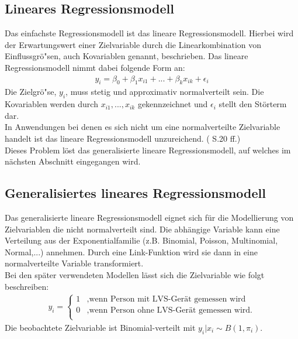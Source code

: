 \documentclass[12pt]{scrreprt}
\begin{document}
\subsection{Lineares Regressionsmodell}
Das einfachste Regressionsmodell ist das lineare Regressionsmodell. Hierbei wird der Erwartungswert einer Zielvariable durch die Linearkombination von Einflussgrö"sen, auch Kovariablen genannt, beschrieben. Das lineare Regressionsmodell nimmt dabei folgende Form an:
\begin{align}
y_{i}= \beta_{0}+\beta_{1}x_{i1}+...+\beta_{k}x_{ik}+\epsilon_{i}
\end{align}
Die Zielgrö"se, $y_{i}$, muss stetig und approximativ normalverteilt sein. Die Kovariablen werden durch $x_{i1},...,x_{ik}$ gekennzeichnet und $\epsilon_{i}$ stellt den Störterm dar. \\
In Anwendungen bei denen es sich nicht um eine normalverteilte Zielvariable handelt ist das lineare Regressionsmodell unzureichend. (\cite{fahrmeir2007regression} S.20 ff.) \\
Dieses Problem löst das generalisierte lineare Regressionsmodell, auf welches im nächsten Abschnitt eingegangen wird. 

\subsection{Generalisiertes lineares Regressionsmodell}
Das generalisierte lineare Regressionsmodell eignet sich für die Modellierung von Zielvariablen die nicht normalverteilt sind. Die abhängige Variable kann eine Verteilung aus der Exponentialfamilie (z.B. Binomial, Poisson, Multinomial, Normal,...) annehmen. Durch eine Link-Funktion wird sie dann in eine normalverteilte Variable transformiert. \\
Bei den später verwendeten Modellen lässt sich die Zielvariable wie folgt beschreiben: \\
\begin{align}
y_{i}=\begin{cases}
1 & \text{,wenn Person mit LVS-Gerät gemessen wird } \\
0 & \text{,wenn Person ohne LVS-Gerät gemessen wird.} \\
\end{cases}
\end{align}
Die beobachtete Zielvariable ist Binomial-verteilt mit $y_{i}|x_{i}\sim B(1,\pi_{i})$. \\
\end{document}
